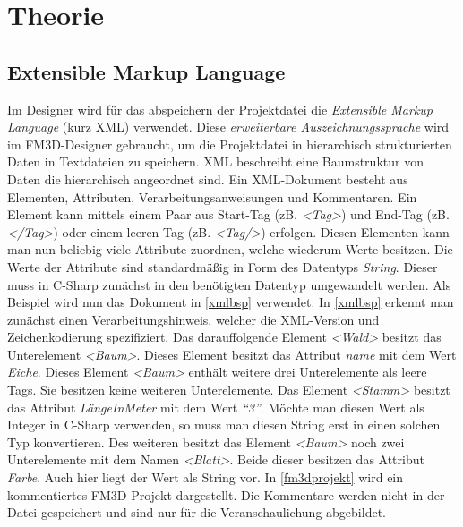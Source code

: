 \chapter{Theorie}
\label{theorie}




\section[Extensible Markup Language]{Extensible Markup Language\cite{xml}\cite{xmlcstutorials}\cite{msdn}}
\label{extensiblemarkuplanguage}

Im Designer wird für das abspeichern der Projektdatei die \textit{Extensible Markup Language} (kurz \ac{XML}) verwendet.  Diese \textit{erweiterbare Auszeichnungssprache} wird im FM3D-Designer gebraucht, um die Projektdatei in hierarchisch strukturierten Daten in Textdateien zu speichern.
\ac{XML} beschreibt eine Baumstruktur von Daten die hierarchisch angeordnet sind. Ein \ac{XML}-Dokument besteht aus Elementen, Attributen, Verarbeitungsanweisungen und Kommentaren. 
Ein Element kann mittels einem Paar aus Start-Tag (zB. \textit{<Tag>}) und End-Tag (zB. \textit{</Tag>}) oder einem leeren Tag (zB. \textit{<Tag/>}) erfolgen.
Diesen Elementen kann man nun beliebig viele Attribute zuordnen, welche wiederum Werte besitzen.
Die Werte der Attribute sind standardmäßig in Form des Datentyps \textit{String}. Dieser muss in C-Sharp zunächst in den benötigten Datentyp umgewandelt werden.
Als Beispiel wird nun das Dokument in \cref{xmlbsp} verwendet. 
In \cref{xmlbsp} erkennt man zunächst einen Verarbeitungshinweis, welcher die XML-Version und Zeichenkodierung spezifiziert. Das darauffolgende Element \textit{<Wald>} besitzt das Unterelement \textit{<Baum>}. Dieses Element besitzt das Attribut \textit{name} mit dem Wert \textit{Eiche}. 
Dieses Element \textit{<Baum>} enthält weitere drei Unterelemente als leere Tags. Sie besitzen keine weiteren Unterelemente. Das Element \textit{<Stamm>} besitzt das Attribut \textit{LängeInMeter} mit dem Wert \textit{"`3"'}. Möchte man diesen Wert als Integer in C-Sharp verwenden, so muss man diesen String erst in einen solchen Typ konvertieren. Des weiteren besitzt das Element \textit{<Baum>} noch zwei Unterelemente mit dem Namen \textit{<Blatt>}. Beide dieser besitzen das Attribut \textit{Farbe}. Auch hier liegt der Wert als String vor.
In \cref{fm3dprojekt} wird ein kommentiertes FM3D-Projekt dargestellt. Die Kommentare werden nicht in der Datei gespeichert und sind nur für die Veranschaulichung abgebildet.

